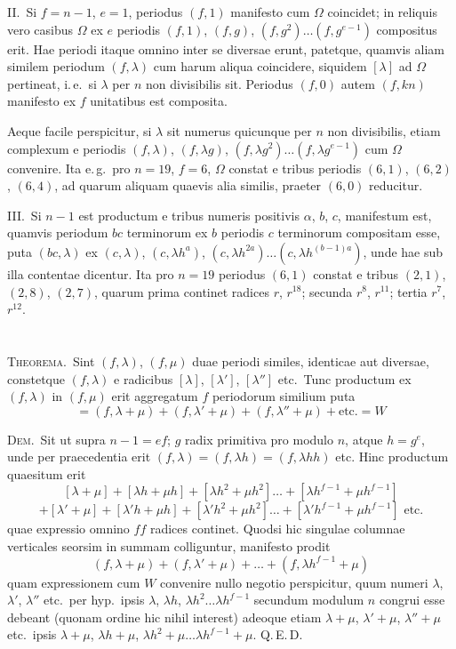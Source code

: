 \documentclass[12pt,a4paper]{article}
\theoremstyle{plain}
\theoremstyle{definition}
\theoremstyle{remark}
\begin{document}
\textsc{II.}\ Si $f=n-1$, $e=1$, periodus $(f,1)$ manifesto cum $\Omega$ coincidet; in reliquis vero casibus $\Omega$ ex $e$ periodis $(f,1)$, $(f,g)$, $(f,g^2)\ldots(f,g^{e-1})$ compositus erit. Hae periodi itaque omnino inter se diversae erunt, patetque, quamvis aliam similem periodum $(f,\lambda)$ cum harum aliqua coincidere, siquidem $[\lambda]$ ad $\Omega$ pertineat, i.\,e.\ si $\lambda$ per $n$ non divisibilis sit. Periodus $(f,0)$ autem $(f,kn)$ manifesto ex $f$ unitatibus est composita.

Aeque facile perspicitur, si $\lambda$ sit numerus quicunque per $n$ non divisibilis, etiam complexum e periodis $(f,\lambda)$, $(f,\lambda g)$, $(f,\lambda g^2)\ldots(f,\lambda g^{e-1})$ cum $\Omega$ convenire. Ita e.\,g.\ pro $n=19$, $f=6$, $\Omega$ constat e tribus periodis $(6,1)$, $(6,2)$, $(6,4)$, ad quarum aliquam quaevis alia similis, praeter $(6,0)$ reducitur.

\textsc{III.}\ Si $n-1$ est productum e tribus numeris positivis $\alpha$, $b$, $c$, manifestum est, quamvis periodum $bc$ terminorum ex $b$ periodis $c$ terminorum compositam esse, puta $(bc,\lambda)$ ex $(c,\lambda)$, $(c,\lambda h^a)$, $(c,\lambda h^{2a})\ldots(c,\lambda h^{(b-1)a})$, unde hae sub illa contentae dicentur. Ita pro $n=19$ periodus $(6,1)$ constat e tribus $(2,1)$, $(2,8)$, $(2,7)$, quarum prima continet radices $r$, $r^{18}$; secunda $r^8$, $r^{11}$; tertia $r^7$, $r^{12}$.

\section{}

\textsc{Theorema.}\ Sint $(f,\lambda)$, $(f,\mu)$ duae periodi similes, identicae aut diversae, constetque $(f,\lambda)$ e radicibus $[\lambda]$, $[\lambda']$, $[\lambda'']$ etc.\ Tunc productum ex $(f,\lambda)$ in $(f,\mu)$ erit aggregatum $f$ periodorum similium puta
\[=(f,\lambda+\mu)+(f,\lambda'+\mu)+(f,\lambda''+\mu)+\text{etc.}=W\]

\textsc{Dem.}\ Sit ut supra $n-1=ef$; $g$ radix primitiva pro modulo $n$, atque $h=g^e$, unde per praecedentia erit $(f,\lambda)=(f,\lambda h)=(f,\lambda hh)$ etc. Hinc productum quaesitum erit
\[[\lambda+\mu]+[\lambda h+\mu h]+[\lambda h^2+\mu h^2]\ldots+[\lambda h^{f-1}+\mu h^{f-1}]\]
\[+ [\lambda'+\mu]+[\lambda' h+\mu h]+[\lambda' h^2+\mu h^2]\ldots+[\lambda' h^{f-1}+\mu h^{f-1}]\text{ etc.}\]
quae expressio omnino $ff$ radices continet. Quodsi hic singulae columnae verticales seorsim in summam colliguntur, manifesto prodit
\[(f,\lambda+\mu)+(f,\lambda'+\mu)+\ldots+(f,\lambda h^{f-1}+\mu)\]
quam expressionem cum $W$ convenire nullo negotio perspicitur, quum numeri $\lambda$, $\lambda'$, $\lambda''$ etc.\ per hyp.\ ipsis $\lambda$, $\lambda h$, $\lambda h^2\ldots\lambda h^{f-1}$ secundum modulum $n$ congrui esse debeant (quonam ordine hic nihil interest) adeoque etiam $\lambda+\mu$, $\lambda'+\mu$, $\lambda''+\mu$ etc.\ ipsis $\lambda+\mu$, $\lambda h+\mu$, $\lambda h^2+\mu\ldots\lambda h^{f-1}+\mu$. Q.\,E.\,D.
\end{document}
